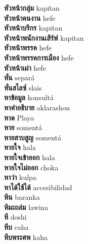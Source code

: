 \textbf{ หัวหน้ากลุ่ม  } kapitan \\
\textbf{ หัวหน้าคนงาน  } hefe \\
\textbf{ หัวหน้าบริกร  } kapitan \\
\textbf{ หัวหน้าพนักงานเสิร์ฟ  } kapitan \\
\textbf{ หัวหน้าพรรค  } hefe \\
\textbf{ หัวหน้าพรรคการเมือง  } hefe \\
\textbf{ หัวหน้าเผ่า  } hefe \\
\textbf{ หั่น  } separá \\
\textbf{ หั่นสไลซ์  } slais \\
\textbf{ หาข้อมูล  } konsultá \\
\textbf{ หาคำอธิบาย  } aklarashon \\
\textbf{ หาด  } Playa \\
\textbf{ หาย  } somentá \\
\textbf{ หายสาบสูญ  } somentá \\
\textbf{ หายใจ  } hala \\
\textbf{ หายใจเข้าออก  } hala \\
\textbf{ หายใจไม่ออก  } choka \\
\textbf{ หาว่า  } kulpa \\
\textbf{ หาได้ใช้ได้  } accesibilidad \\
\textbf{ หิน  } baranka \\
\textbf{ หิมะถล่ม  } lawina \\
\textbf{ หี  } doshi \\
\textbf{ หีบ  } caha \\
\textbf{ หีบพระศพ  } kaha \\
